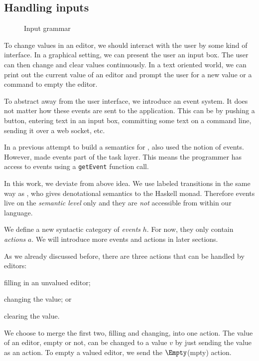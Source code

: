 \subsection{Handling inputs}
\label{sec:handling}

\begin{figure}
  \small
  \caption{Input grammar} \label{fig:input-grammar}
\end{figure}

To change values in an editor,
we should interact with the user by some kind of interface.
In a graphical setting,
we can present the user an input box.
The user can then change and clear values continuously.
In a text oriented world,
we can print out the current value of an editor
and prompt the user for a new value
or a command to empty the editor.

To abstract away from the user interface,
we introduce an event system.
It does not matter how these events are sent to the application.
This can be by pushing a button,
entering text in an input box,
committing some text on a command line,
sending it over a web socket,
etc.

In a previous attempt to build a semantics for \TOP,
\textcite{theses/radboud/VinterHviid18} also used the notion of events.
However, \citeauthor{theses/radboud/VinterHviid18} made events part of the task layer.
This means the programmer has access to events using a \texttt{getEvent} function call.

In this work,
we deviate from above idea.
We use labeled transitions in the same way as \textcite{school/maktoberdorf/PeytonJones01},
who gives denotational semantics to the Haskell \IO monad.
Therefore events live on the \emph{semantic level} only
and they are \emph{not} accessible from within our language.

We define a new syntactic category of \emph{events} $h$.
For now, they only contain \emph{actions} $a$.
We will introduce more events and actions in later sections.

As we already discussed before,
there are three actions that can be handled by editors:
\begin{enumerate*}
  \item filling in an unvalued editor;
  \item changing the value; or
  \item clearing the value.
\end{enumerate*}
We choose to merge the first two, filling and changing, into one action.
The value of an editor, empty or not, can be changed to a value $v$ by just sending the value as an action.
To empty a valued editor, we send the $\Empty$(mpty) action.

